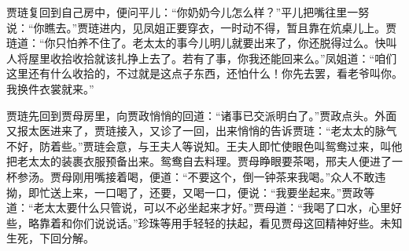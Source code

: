 \begin{parag}
    贾琏复回到自己房中，便问平儿：“你奶奶今儿怎么样？”平儿把嘴往里一努说：“你瞧去。”贾琏进内，见凤姐正要穿衣，一时动不得，暂且靠在炕桌儿上。贾琏道：“你只怕养不住了。老太太的事今儿明儿就要出来了，你还脱得过么。快叫人将屋里收拾收拾就该扎挣上去了。若有了事，你我还能回来么。”凤姐道：“咱们这里还有什么收拾的，不过就是这点子东西，还怕什么！你先去罢，看老爷叫你。我换件衣裳就来。”
\end{parag}


\begin{parag}
    贾琏先回到贾母房里，向贾政悄悄的回道：“诸事已交派明白了。”贾政点头。外面又报太医进来了，贾琏接入，又诊了一回，出来悄悄的告诉贾琏：“老太太的脉气不好，防着些。”贾琏会意，与王夫人等说知。王夫人即忙使眼色叫鸳鸯过来，叫他把老太太的装裹衣服预备出来。鸳鸯自去料理。贾母睁眼要茶喝，邢夫人便进了一杯参汤。贾母刚用嘴接着喝，便道：“不要这个，倒一钟茶来我喝。”众人不敢违拗，即忙送上来，一口喝了，还要，又喝一口，便说：“我要坐起来。”贾政等道：“老太太要什么只管说，可以不必坐起来才好。”贾母道：“我喝了口水，心里好些，略靠着和你们说说话。”珍珠等用手轻轻的扶起，看见贾母这回精神好些。未知生死，下回分解。
\end{parag}